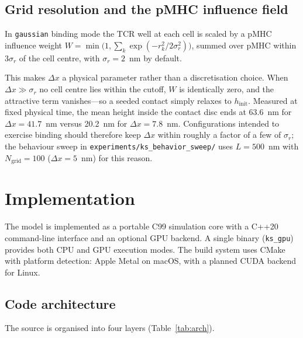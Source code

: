 \documentclass[11pt,a4paper]{article}
\begin{document}
\subsection{Grid resolution and the pMHC influence field}
\label{sec:resolution}

In \texttt{gaussian} binding mode the TCR well at each cell is scaled by a pMHC
influence weight $W=\min\!\bigl(1,\sum_k \exp(-r_k^2/2\sigma_r^2)\bigr)$, summed
over pMHC within $3\sigma_r$ of the cell centre, with $\sigma_r=2$~nm by default.

This makes $\Delta x$ a physical parameter rather than a discretisation choice.
When $\Delta x \gg \sigma_r$ no cell centre lies within the cutoff, $W$ is
identically zero, and the attractive term vanishes---so a seeded contact simply
relaxes to $h_\text{init}$.  Measured at fixed physical time, the mean height
inside the contact disc ends at 63.6~nm for $\Delta x=41.7$~nm versus 20.2~nm for
$\Delta x=7.8$~nm.  Configurations intended to exercise binding should therefore
keep $\Delta x$ within roughly a factor of a few of $\sigma_r$; the behaviour
sweep in \texttt{experiments/ks\_behavior\_sweep/} uses $L=500$~nm with
$N_\text{grid}=100$ ($\Delta x=5$~nm) for this reason.

\section{Implementation}
\label{sec:implementation}

The model is implemented as a portable C99 simulation core with a
C++20 command-line interface and an optional GPU backend.  A single
binary (\texttt{ks\_gpu}) provides both CPU and GPU execution modes.
The build system uses CMake with platform detection: Apple Metal on
macOS, with a planned CUDA backend for Linux.

\subsection{Code architecture}

The source is organised into four layers (Table~\ref{tab:arch}).
\end{document}
